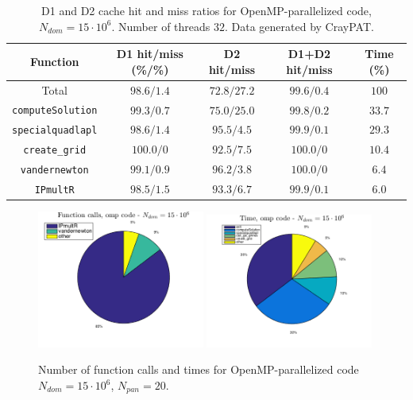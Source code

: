 \documentclass[a4paper,10pt]{article}
\def\code#1{\texttt{#1}}
\begin{document}
\begin{table}[ht]
\begin{center}
    \begin{tabular}{ c | c | c | c | c }
        Function & D1 hit/miss (\%/\%) & D2 hit/miss & D1+D2 hit/miss & Time (\%) \\ \hline
        Total & $98.6/1.4$ & $72.8/27.2$ & $99.6/0.4$ & $100$ \\ 
        \code{computeSolution} & $99.3/0.7$ & $75.0/25.0$ & $99.8/0.2$ & $33.7$ \\
        \code{specialquadlapl} & $98.6/1.4$ & $95.5/4.5$ & $99.9/0.1$ & $29.3$ \\
        \code{create\_grid} & $100.0/0$ & $92.5/7.5$ & $100.0/0$ & $10.4$ \\
        \code{vandernewton} & $99.1/0.9$ & $96.2/3.8$ & $100.0/0$ & $6.4$ \\
        \code{IPmultR} & $98.5/1.5$ & $93.3/6.7$ & $99.9/0.1$ & $6.0$
    \end{tabular}
    \caption{D1 and D2 cache hit and miss ratios for OpenMP-parallelized code, $N_{dom} = 15\cdot10^6$. Number of threads $32$. Data generated by CrayPAT.}
    \label{tab:openmp_caches}
\end{center}
\end{table} 
\begin{figure}[ht]
    \begin{center}
        \includegraphics[width=0.49\textwidth]{Graphics/omp_strong_pie_calls.png}
        \includegraphics[width=0.49\textwidth]{Graphics/omp_strong_pie_time.png}
    \end{center}
    \caption{Number of function calls and times for OpenMP-parallelized code $N_{dom} = 15\cdot10^6$, $N_{pan} = 20$.}
    \label{fig:omp_strong_pie}
\end{figure}
\end{document}
